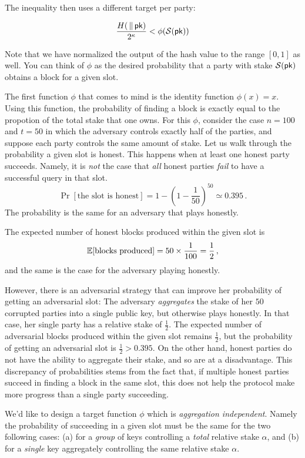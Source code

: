 The inequality then uses a different target per party:

\[
  \frac{H(\sl \,\|\, \mathsf{pk})}{2^\kappa} < \phi(\mathcal{S}(\mathsf{pk}))
\]

Note that we have normalized the output of the hash value to the range $[0, 1]$ as well.
You can think of $\phi$ as the desired probability that a party with stake $\mathcal{S}(\mathsf{pk})$
obtains a block for a given slot.

The first function $\phi$ that comes to mind is the identity function $\phi(x) = x$.
Using this function, the probability of finding a block is exactly equal to the propotion
of the total stake that one owns. For this $\phi$, consider the case $n = 100$ and $t = 50$
in which the adversary controls exactly half of the parties, and suppose each party controls
the same amount of stake. Let us walk through the probability a given slot is honest.
This happens when at least one honest party succeeds. Namely, it is \emph{not}
the case that \emph{all} honest parties \emph{fail} to have a successful query in that slot.
\[
  \Pr[\text{the slot is honest}] = 1 - (1 - \frac{1}{50})^{50} \simeq 0.395\,.
\]
The probability is the same for an adversary that plays honestly.

The expected number of honest blocks
produced within the given slot is
\[
  \mathbb{E}[\text{blocks produced}] = 50 \times \frac{1}{100} = \frac{1}{2}\,,
\]
and the same is the case for the adversary playing honestly.

However, there is an adversarial
strategy that can improve her probability of getting an adversarial slot: The adversary
\emph{aggregates} the stake of her $50$ corrupted parties into a single public key, but
otherwise plays honestly. In
that case, her single party has a relative stake of $\frac{1}{2}$.
The expected number of adversarial blocks produced within the given slot remains $\frac{1}{2}$,
but the probability of getting an
adversarial slot is $\frac{1}{2} > 0.395$. On the other hand, honest parties do not have the ability
to aggregate their stake, and so are at a disadvantage.
This discrepancy of probabilities stems from the fact that, if multiple honest parties succeed in
finding a block in the same slot, this does not help the protocol make more progress than a single party
succeeding.

We'd like to design a target function $\phi$ which is \emph{aggregation independent}.
Namely the probability of succeeding in a given slot must be the same for the two following cases:
(a) for a \emph{group} of keys controlling a \emph{total} relative stake $\alpha$, and
(b) for a \emph{single} key aggregately controlling the same relative stake $\alpha$.


